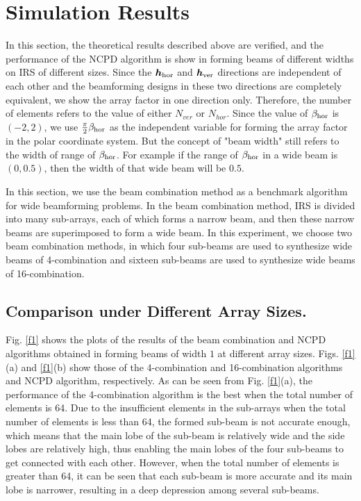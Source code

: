 \documentclass[12pt,draftclsnofoot,onecolumn]{IEEEtran}
\begin{document}
	\section{Simulation Results }
	In this section, the theoretical results described above are verified, and the performance of the NCPD algorithm is show in forming  beams of different widths on IRS of different sizes. Since the ${\bm h}_{\rm hor}$  and ${\bm h}_{\rm ver}$ directions are independent of each other and the beamforming designs in these two directions are completely equivalent, we  show the array factor in one direction only. Therefore,  the number of elements refers to the value of either $N_{ver}$ or $N_{hor}$. Since the value   of $\beta_{\rm hor}$ is $(-2,2)$, we use $\frac{\pi}{2}\beta_{\rm hor}$ as the independent variable for forming the array factor in the polar coordinate system. But the concept of "beam width" still refers to the width of range of $\beta_{\rm hor}$. For example if the range of  $\beta_{\rm hor}$ in a wide beam is $(0,0.5)$, then the width of that wide beam will be $0.5$. 
	
	In this section, we  use the beam combination method as a benchmark algorithm for wide beamforming problems. In the beam combination method, IRS is divided into many sub-arrays, each of which forms a narrow beam, and then these narrow beams are superimposed to form a wide beam. 
	In this experiment, we choose two beam combination methods, in which four sub-beams are used to synthesize wide beams of 4-combination and sixteen sub-beams are used to synthesize wide beams of 16-combination. 
	
	\subsection{Comparison under Different Array Sizes.}
	Fig. \ref{f1} shows the plots of the results of the  beam combination and NCPD algorithms obtained in forming beams of width $1$ at different array sizes. Figs. \ref{f1}(a) and \ref{f1}(b) show those of  the 4-combination and 16-combination algorithms and  NCPD algorithm, respectively. As can be seen from Fig. \ref{f1}(a), the performance of the 4-combination algorithm is the best when the total number of elements is 64. Due to the insufficient elements in the sub-arrays when the total number of elements is less than 64, the formed sub-beam is not accurate enough, which means that the main lobe of the sub-beam is relatively wide and the side lobes are relatively high, thus enabling the main lobes of the four sub-beams to get connected with each other. However, when the total number of elements is greater than 64, it can be seen that each sub-beam is more accurate and its main lobe  is narrower, resulting in a deep depression among several sub-beams. 
	
\end{document}
